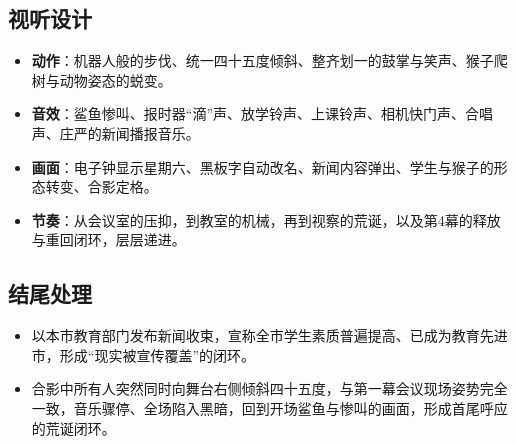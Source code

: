 \documentclass[11pt, a4paper]{article}
\begin{document}
        \subsection{视听设计}
        \begin{itemize}[leftmargin=2em, itemsep=0.2em]
                \item \textbf{动作}：机器人般的步伐、统一四十五度倾斜、整齐划一的鼓掌与笑声、猴子爬树与动物姿态的蜕变。
                \item \textbf{音效}：鲨鱼惨叫、报时器“滴”声、放学铃声、上课铃声、相机快门声、合唱声、庄严的新闻播报音乐。
                \item \textbf{画面}：电子钟显示星期六、黑板字自动改名、新闻内容弹出、学生与猴子的形态转变、合影定格。
                \item \textbf{节奏}：从会议室的压抑，到教室的机械，再到视察的荒诞，以及第4幕的释放与重回闭环，层层递进。
        \end{itemize}

        \subsection{结尾处理}
        \begin{itemize}[leftmargin=2em, itemsep=0.2em]
                \item 以本市教育部门发布新闻收束，宣称全市学生素质普遍提高、已成为教育先进市，形成“现实被宣传覆盖”的闭环。
                \item 合影中所有人突然同时向舞台右侧倾斜四十五度，与第一幕会议现场姿势完全一致，音乐骤停、全场陷入黑暗，回到开场鲨鱼与惨叫的画面，形成首尾呼应的荒诞闭环。
        \end{itemize}
\end{document}
